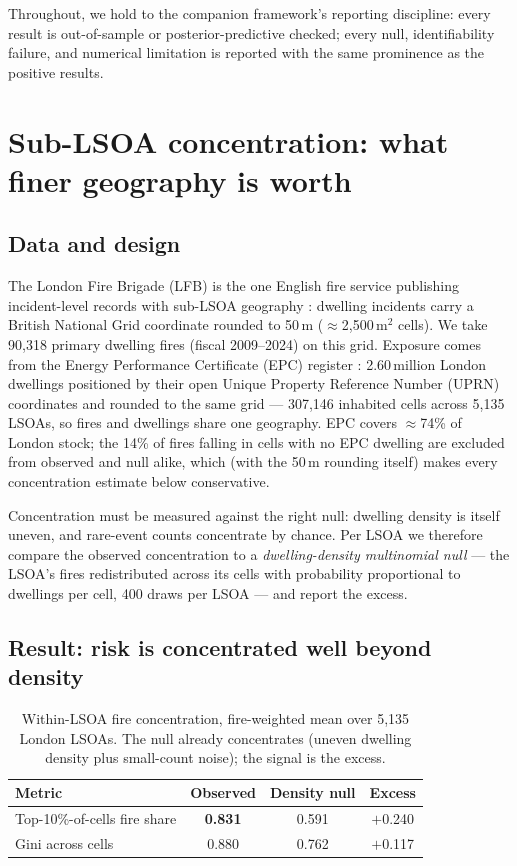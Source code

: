 \documentclass[11pt]{article}
\begin{document}
Throughout, we hold to the companion framework's reporting discipline: every
result is out-of-sample or posterior-predictive checked; every null,
identifiability failure, and numerical limitation is reported with the same
prominence as the positive results.

\section{Sub-LSOA concentration: what finer geography is worth}
\label{sec:london}

\subsection{Data and design}

The London Fire Brigade (LFB) is the one English fire service publishing
incident-level records with sub-LSOA geography \citep{lfb_incidents}: dwelling
incidents carry a British National Grid coordinate rounded to 50\,m
($\approx$2{,}500\,m$^2$ cells). We take 90{,}318 primary dwelling fires
(fiscal 2009--2024) on this grid. Exposure comes from the Energy Performance
Certificate (EPC) register \citep{epcregister2025}: 2.60\,million London
dwellings positioned by their open Unique Property Reference Number (UPRN)
coordinates and rounded to the same grid --- 307{,}146 inhabited cells across
5{,}135 LSOAs, so fires and dwellings share one geography. EPC covers
$\approx$74\% of London stock; the 14\% of fires falling in cells with no EPC
dwelling are excluded from observed and null alike, which (with the 50\,m
rounding itself) makes every concentration estimate below conservative.

Concentration must be measured against the right null: dwelling density is
itself uneven, and rare-event counts concentrate by chance. Per LSOA we
therefore compare the observed concentration to a \emph{dwelling-density
multinomial null} --- the LSOA's fires redistributed across its cells with
probability proportional to dwellings per cell, 400 draws per LSOA --- and
report the excess.

\subsection{Result: risk is concentrated well beyond density}

\begin{table}[htbp]
  \centering
  \caption{Within-LSOA fire concentration, fire-weighted mean over 5{,}135
  London LSOAs. The null already concentrates (uneven dwelling density plus
  small-count noise); the signal is the excess.}
  \label{tab:concentration}
  \small
  \begin{tabular}{@{}lccc@{}}
    \toprule
    Metric & Observed & Density null & Excess \\
    \midrule
    Top-10\%-of-cells fire share & \textbf{0.831} & 0.591 & $+$0.240 \\
    Gini across cells            & 0.880 & 0.762 & $+$0.117 \\
    \bottomrule
  \end{tabular}
\end{table}
\end{document}

